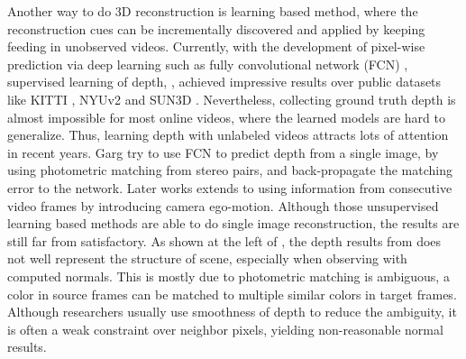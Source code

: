 Another way to do 3D reconstruction is learning based method, where the reconstruction cues can be incrementally discovered and applied by keeping feeding in unobserved videos. Currently, with the development of pixel-wise prediction via deep learning such as fully convolutional network (FCN) \cite{long2015fully}, supervised learning of depth, \eg \cite{eigen2014depth,ummenhofer2016demon}, achieved impressive results over public datasets like KITTI \cite{}, NYUv2 \cite{silberman2012indoor} and SUN3D \cite{xiao2013sun3d}. 
Nevertheless, collecting ground truth depth is almost impossible for most online videos, where the learned models are hard to generalize. 
Thus, learning depth with unlabeled videos attracts lots of attention in recent years.
Garg \etal \cite{godard2016unsupervised} try to use FCN to predict depth from a single image, by using photometric matching from stereo pairs, and back-propagate the matching error to the network. Later works \cite{zhou2017unsupervised,Vijayanarasimhan17} extends to using information from consecutive video frames by introducing camera ego-motion. 
Although those unsupervised learning based methods are able to do single image reconstruction, the results are still far from satisfactory. As shown at the left of , the depth results from \cite{zhou2017unsupervised} does not well represent the structure of scene, especially when observing with computed normals. 
This is mostly due to photometric matching is ambiguous, \ie a color in source frames can be matched to multiple similar colors in target frames. Although researchers usually use smoothness of depth \cite{zhou2017unsupervised} to reduce the ambiguity, it is often a weak constraint over neighbor pixels, yielding non-reasonable normal results.

